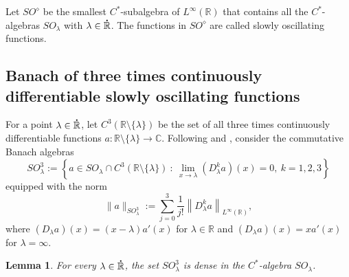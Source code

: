 \documentclass{birkjour}
\newtheorem{lemma}[theorem]{Lemma}
\numberwithin{equation}{section}
\newcommand{\C}{\mathbb{C}}
\newcommand{\R}{\mathbb{R}}
\newcommand{\dR}{{\bf\dot{\R}}}
\begin{document}
Let $SO^\diamond$ be the smallest $C^*$-subalgebra of $L^\infty(\R)$ that
contains all the $C^*$-algebras $SO_\lambda$ with $\lambda\in\dR$.
The functions in $SO^\diamond$ are called slowly oscillating functions.
\subsection{Banach  of three times continuously
differentiable slowly oscillating functions}
For a point $\lambda\in\dR$, let $C^3(\R\setminus\{\lambda\})$ be the set of
all three times continuously differentiable functions
$a:\R\setminus\{\lambda\}\to\C$.
Following \cite[Section~2.4]{KILH12} and \cite[Section~2.3]{KILH13a}, consider
the commutative Banach algebras
\[
SO_\lambda^3:=\left\{
a\in SO_\lambda\cap C^3(\R\setminus\{\lambda\})\ :\
\lim_{x\to\lambda}(D_\lambda^k a)(x)=0,
\ k=1,2,3
\right\}
\]
equipped with the norm
\[
\|a\|_{SO_\lambda^3}:=
\sum_{j=0}^3\frac{1}{j!}\left\|D_\lambda^ka\right\|_{L^\infty(\R)},
\]
where $(D_\lambda a)(x)=(x-\lambda) a'(x)$ for $\lambda\in\R$ and
$(D_\lambda a)(x)=xa'(x)$ for $\lambda=\infty$.
\begin{lemma}\label{le:SO3-lambda-is-dense-in-SO-lambda}
For every $\lambda\in\dR$, the set $SO_\lambda^3$ is dense in the
$C^*$-algebra $SO_\lambda$.
\end{lemma}
\end{document}
